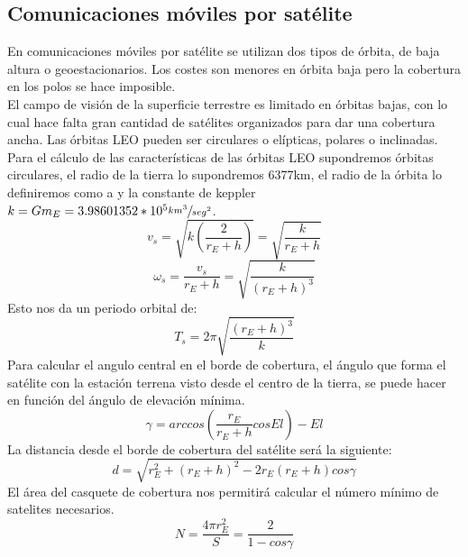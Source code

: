 	\subsection{Comunicaciones móviles por satélite}
	\label{sub:satMovil}
		En comunicaciones móviles por satélite se utilizan dos tipos de órbita, de baja altura o geoestacionarios. Los costes son menores en órbita baja pero la cobertura en los polos se hace imposible.\\
		El campo de visión de la superficie terrestre es limitado en órbitas bajas, con lo cual hace falta gran cantidad de satélites organizados para dar una cobertura ancha. Las órbitas \acrshort{LEO} pueden ser circulares o elípticas, polares o inclinadas. Para el cálculo de las características de las órbitas \acrshort{LEO} supondremos órbitas circulares, el radio de la tierra lo supondremos 6377km, el radio de la órbita lo definiremos como a y la constante de keppler $k=Gm_E=3.98601352*10^5\sfrac{km^3}{seg^2}$.
		\begin{equation}
			\tag{Velocidad lineal}
			v_s=\sqrt{k(\frac{2}{r_E+h})}=\sqrt{\frac{k}{r_E+h}}
		\end{equation}
		\begin{equation}
			\tag{Velocidad angular}
			\omega_s=\frac{v_s}{r_E+h}=\sqrt{\frac{k}{(r_E+h)^3}}
		\end{equation}
		Esto nos da un periodo orbital de:
		\begin{equation}
			\tag{Periodo orbital}
			T_s=2\pi\sqrt{\frac{(r_E+h)^3}{k}}
		\end{equation}
		Para calcular el angulo central en el borde de cobertura, el ángulo que forma el satélite con la estación terrena visto desde el centro de la tierra, se puede hacer en función del ángulo de elevación mínima.
		\begin{equation}
			\tag{Ángulo central}
			\gamma=arccos(\frac{r_E}{r_E+h}cosEl)-El
		\end{equation}
		La distancia desde el borde de cobertura del satélite será la siguiente:
		\begin{equation}
			\tag{Distancia al satélite}
			d=\sqrt{r_E^2+(r_E+h)^2-2r_E(r_E+h)cos\gamma}
		\end{equation}
		El área del casquete de cobertura nos permitirá calcular el número mínimo de satelites necesarios.
		\begin{equation}
			\tag{Número de satélites}
			N=\frac{4\pi r_E^2}{S}=\frac{2}{1-cos\gamma}
		\end{equation}
